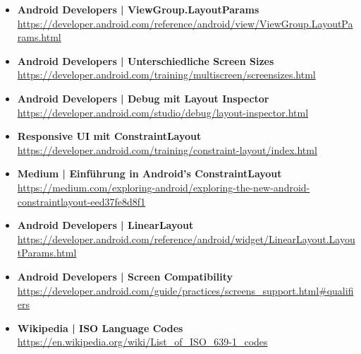 \documentclass[a4paper]{article}
\begin{document}
		\begin{itemize}
			\item \textbf{Android Developers | ViewGroup.LayoutParams}\\
			\href{https://developer.android.com/reference/android/view/ViewGroup.LayoutParams.html}
			{https://developer.android.com/reference/android/view/ViewGroup.LayoutParams.html}
			
			\item \textbf{Android Developers | Unterschiedliche Screen Sizes}\\
			\href{https://developer.android.com/training/multiscreen/screensizes.html}
			{https://developer.android.com/training/multiscreen/screensizes.html}
			
			\item \textbf{Android Developers | Debug mit Layout Inspector}\\
			\href{https://developer.android.com/studio/debug/layout-inspector.html}
			{https://developer.android.com/studio/debug/layout-inspector.html}
			
			\item \textbf{Responsive UI mit ConstraintLayout}\\
			\href{https://developer.android.com/training/constraint-layout/index.html}
			{https://developer.android.com/training/constraint-layout/index.html}
			
			\item \textbf{Medium | Einführung in Android's ConstraintLayout}\\
			\href{https://medium.com/exploring-android/exploring-the-new-android-constraintlayout-eed37fe8d8f1}
			{https://medium.com/exploring-android/exploring-the-new-android-constraintlayout-eed37fe8d8f1}
			
			\item \textbf{Android Developers | LinearLayout}\\
			\href{https://developer.android.com/reference/android/widget/LinearLayout.LayoutParams.html}
			{https://developer.android.com/reference/android/widget/LinearLayout.LayoutParams.html}
			
			\item \textbf{Android Developers | Screen Compatibility}\\
			\href{https://developer.android.com/guide/practices/screens_support.html#qualifiers}
			{https://developer.android.com/guide/practices/screens\_support.html\#qualifiers}
			
			\item \textbf{Wikipedia | ISO Language Codes}\\
			\href{https://en.wikipedia.org/wiki/List_of_ISO_639-1_codes}
			{https://en.wikipedia.org/wiki/List\_of\_ISO\_639-1\_codes}
			

\end{itemize}
\end{document}
